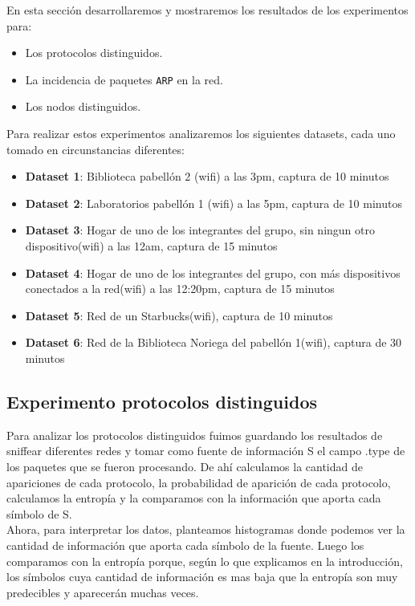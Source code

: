 En esta sección desarrollaremos y mostraremos los resultados de los experimentos para:

\begin{itemize}
\item Los protocolos distinguidos.
\item La incidencia de paquetes \texttt{ARP} en la red.
\item Los nodos distinguidos.
\end{itemize}

Para realizar estos experimentos analizaremos los siguientes datasets, cada uno tomado en circunstancias diferentes:

\begin{itemize}
\item \textbf{Dataset 1}: Biblioteca pabellón 2 (wifi) a las 3pm, captura de 10 minutos
\item \textbf{Dataset 2}: Laboratorios pabellón 1 (wifi) a las 5pm, captura de 10 minutos
\item \textbf{Dataset 3}: Hogar de uno de los integrantes del grupo, sin ningun otro dispositivo(wifi) a las 12am, captura de 15 minutos
\item \textbf{Dataset 4}: Hogar de uno de los integrantes del grupo, con más dispositivos conectados a la red(wifi) a las 12:20pm, captura de 15 minutos
\item \textbf{Dataset 5}: Red de un Starbucks(wifi), captura de 10 minutos
\item \textbf{Dataset 6}: Red de la Biblioteca Noriega del pabellón 1(wifi), captura de 30 minutos
\end{itemize}


\subsection{Experimento protocolos distinguidos}

Para analizar los protocolos distinguidos fuimos guardando los resultados de sniffear diferentes redes y tomar como fuente de información S el campo .type de los paquetes que se fueron procesando. De ahí calculamos la cantidad de apariciones de cada protocolo, la probabilidad de aparición de cada protocolo, calculamos la entropía y la comparamos con la información que aporta cada símbolo de S.\\

Ahora, para interpretar los datos, planteamos histogramas donde podemos ver la cantidad de información que aporta cada símbolo de la fuente. Luego los comparamos con la entropía porque, según lo que explicamos en la introducción, los símbolos cuya cantidad de información es mas baja que la entropía son muy predecibles y aparecerán muchas veces. \\

